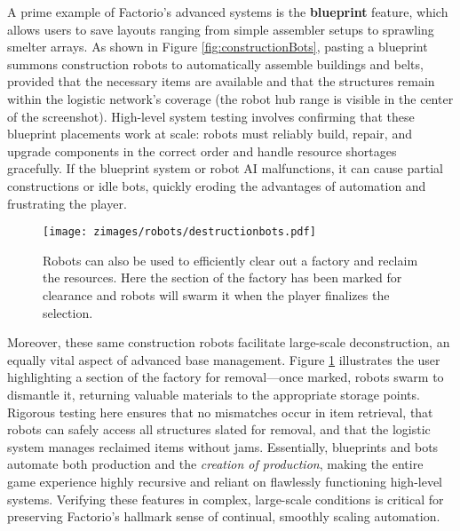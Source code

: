 A prime example of Factorio’s advanced systems is the \textbf{blueprint} feature, which allows users to save layouts ranging from simple assembler setups to sprawling smelter arrays. As shown in Figure \ref{fig:constructionBots}, pasting a blueprint summons construction robots to automatically assemble buildings and belts, provided that the necessary items are available and that the structures remain within the logistic network’s coverage (the robot hub range is visible in the center of the screenshot). High-level system testing involves confirming that these blueprint placements work at scale: robots must reliably build, repair, and upgrade components in the correct order and handle resource shortages gracefully. If the blueprint system or robot AI malfunctions, it can cause partial constructions or idle bots, quickly eroding the advantages of automation and frustrating the player.

\begin{figure}[ht]
    \centering
    \texttt{[image: zimages/robots/destructionbots.pdf]}
    \caption{Robots can also be used to efficiently clear out a factory and reclaim the resources. Here the section of the factory has been marked for clearance and robots will swarm it when the player finalizes the selection. \cite{destructionBots}}
    \label{fig:destructionBots}
\end{figure}

Moreover, these same construction robots facilitate large-scale deconstruction, an equally vital aspect of advanced base management. Figure \ref{fig:destructionBots} illustrates the user highlighting a section of the factory for removal—once marked, robots swarm to dismantle it, returning valuable materials to the appropriate storage points. Rigorous testing here ensures that no mismatches occur in item retrieval, that robots can safely access all structures slated for removal, and that the logistic system manages reclaimed items without jams. Essentially, blueprints and bots automate both production and the \textit{creation of production}, making the entire game experience highly recursive and reliant on flawlessly functioning high-level systems. Verifying these features in complex, large-scale conditions is critical for preserving Factorio’s hallmark sense of continual, smoothly scaling automation.
